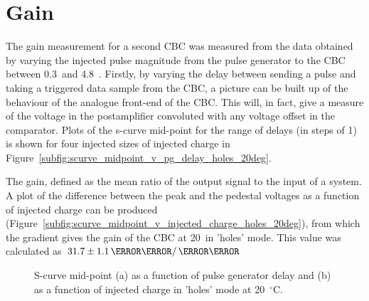 \section{Gain}
\label{s:gain}

The gain measurement for a second CBC was measured from the data obtained by varying the injected pulse
magnitude from the pulse generator to the CBC between 0.3~\fC and 4.8~\fC. Firstly, by varying the delay
between sending a pulse and taking a triggered data sample from the CBC, a picture can be built up of the
behaviour of the analogue front-end of the CBC. This will, in fact, give a measure of the voltage in the
postamplifier convoluted with any voltage offset in the comparator. Plots of the s-curve mid-point for the
range of delays (in steps of 1\ns) is shown for four injected sizes of injected charge in
Figure~\ref{subfig:scurve_midpoint_v_pg_delay_holes_20deg}.

The gain, defined as the mean ratio of the output signal to the input of a system. A plot of the difference
between the peak and the pedestal voltages as a function of injected charge can be produced
(Figure~\ref{subfig:scurve_midpoint_v_injected_charge_holes_20deg}), from which the gradient gives the gain of
the CBC at 20~\degreeCelsius in 'holes' mode. This value was calculated as $31.7\pm1.1\mV/\fC$

\begin{figure}[hbtp]
	\centering
	\caption{S-curve mid-point (a) as a function of pulse generator delay and (b) as a function of injected
    charge in 'holes' mode at 20~$^{\circ}$C.}
    \label{fig:midpoint_v_delay_and_charge_holes_20deg}
\end{figure}


